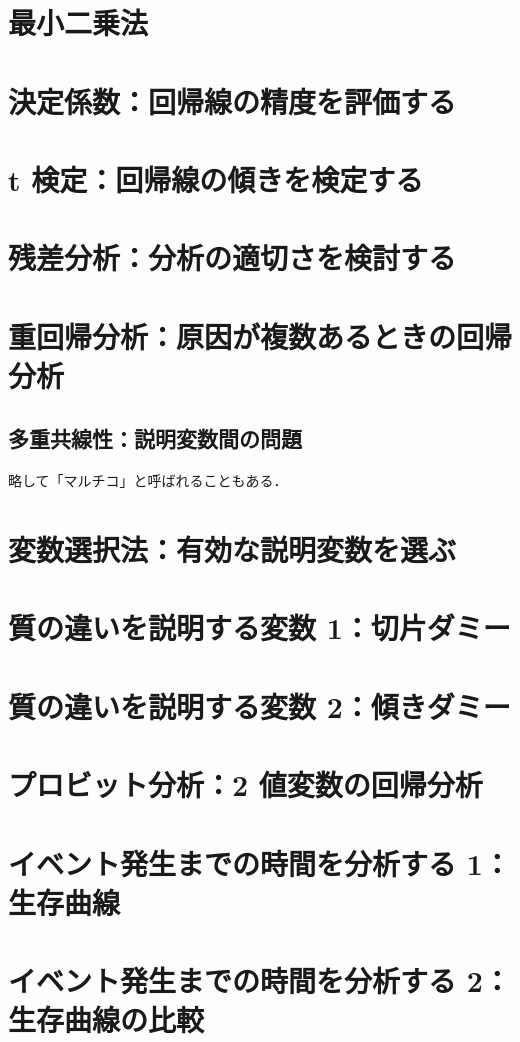 \section{最小二乗法}
\section{決定係数：回帰線の精度を評価する}
\section{t 検定：回帰線の傾きを検定する}
\section{残差分析：分析の適切さを検討する}

\section{重回帰分析：原因が複数あるときの回帰分析}
\subsection{多重共線性：説明変数間の問題}

略して「マルチコ」と呼ばれることもある．

\section{変数選択法：有効な説明変数を選ぶ}
\section{質の違いを説明する変数 1：切片ダミー}
\section{質の違いを説明する変数 2：傾きダミー}
\section{プロビット分析：2 値変数の回帰分析}
\section{イベント発生までの時間を分析する 1：生存曲線}
\section{イベント発生までの時間を分析する 2：生存曲線の比較}
